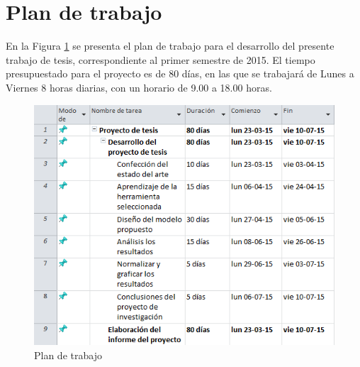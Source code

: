 \documentclass[12pt,letterpaper]{article}
\begin{document}
\section{Plan de trabajo}
En la Figura \ref{fig:cartagantt} se presenta el plan de trabajo para el desarrollo del presente trabajo de tesis, correspondiente al primer semestre de 2015. El tiempo presupuestado para el proyecto es de 80 días, en las que se trabajará de Lunes a Viernes 8 horas diarias, con un horario de 9.00 a 18.00 horas.

\newpage
\begin{figure}[!ht]
\centering
\includegraphics[scale=1]{images/CartaGantt.png}
\caption{Plan de trabajo}
\label{fig:cartagantt}
\end{figure}

\clearpage
{}


\end{document}
